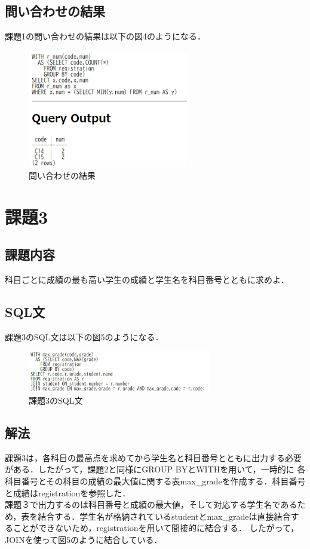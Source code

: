 \documentclass[dvipdfmx]{jarticle}
\begin{document}
\subsection{問い合わせの結果}
課題1の問い合わせの結果は以下の図4のようになる．
\begin{figure}[h]
    \centering
    \includegraphics[width = 7cm]{2.png}
    \caption{問い合わせの結果}
\end{figure}
\section{課題3}
\subsection{課題内容}
科目ごとに成績の最も高い学生の成績と学生名を科目番号とともに求めよ．
\subsection{SQL文}
課題3のSQL文は以下の図5のようになる．
\begin{figure}[h]
    \centering
    \includegraphics[width = 8cm]{sql3.png}
    \caption{課題3のSQL文}
\end{figure}
\subsection{解法}
課題3は，各科目の最高点を求めてから学生名と科目番号とともに出力する必要がある．したがって，課題2と同様にGROUP BYとWITHを用いて，一時的に
各科目番号とその科目の成績の最大値に関する表max\_gradeを作成する．科目番号と成績はregistrationを参照した．\\
課題３で出力するのは科目番号と成績の最大値，そして対応する学生名であるため，表を結合する．学生名が格納されているstudentとmax\_gradeは直接結合することができないため，registrationを用いて間接的に結合する．
したがって，JOINを使って図5のように結合している．
\end{document}
